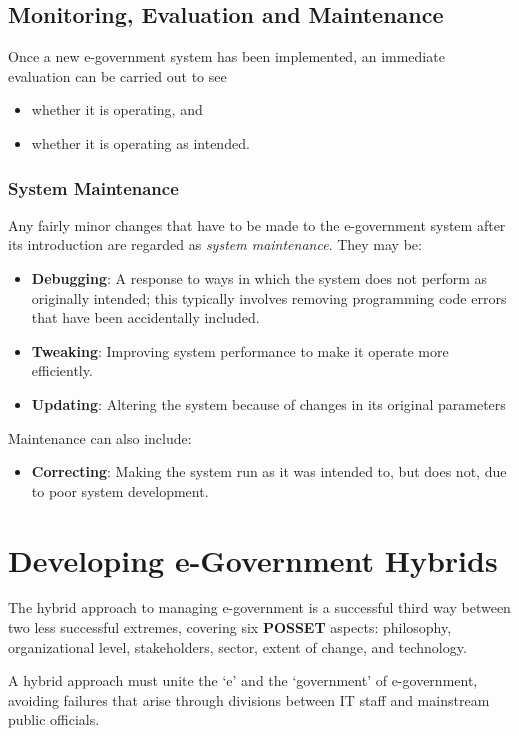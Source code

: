 \subsection{Monitoring, Evaluation and Maintenance}

Once a new e-government system has been
implemented, an immediate evaluation
can be carried out to see 
\begin{itemize}
	\item whether it is	operating, and
	\item whether it is operating as intended.
\end{itemize}


\subsubsection*{System Maintenance}
Any fairly minor
changes that have to be made to the
e-government system after its introduction are
regarded as \textit{system maintenance}. They may be:

\begin{itemize}
	\item \textbf{Debugging}: A response to ways in which
	the system does not perform as originally
	intended; this typically involves removing programming code errors that have
	been accidentally included.
	\item \textbf{Tweaking}: Improving system performance
	to make it operate more efficiently.
	\item \textbf{Updating}: Altering the system because of
	changes in its original parameters
\end{itemize}

Maintenance can also include:
\begin{itemize}
	\item \textbf{Correcting}: Making the system run as it
	was intended to, but does not, due to
	poor system development.
\end{itemize}


\section{Developing e-Government Hybrids}
The hybrid approach to managing e-government is a successful third way between two
less successful extremes, covering six \textbf{POSSET} aspects: philosophy, organizational level, stakeholders, sector, extent of change, and technology.

A hybrid approach must unite the `e' and the `government' of e-government, avoiding
failures that arise through divisions between IT staff and mainstream public officials.

